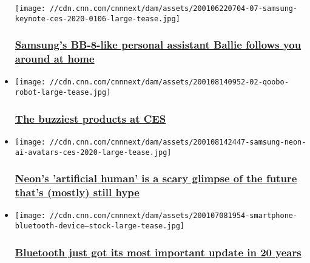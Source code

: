 \begin{itemize}
  \texttt{[image: //cdn.cnn.com/cnnnext/dam/assets/200106220704-07-samsung-keynote-ces-2020-0106-large-tease.jpg]}

  \hypertarget{samsungs-bb-8-like-personal-assistant-ballie-follows-you-around-at-home}{%
  \subsubsection{\texorpdfstring{\href{/2020/01/07/tech/samsung-ballie-ces-2020/index.html}{Samsung's
  BB-8-like personal assistant Ballie follows you around at
  home}}{Samsung's BB-8-like personal assistant Ballie follows you around at home}}\label{samsungs-bb-8-like-personal-assistant-ballie-follows-you-around-at-home}}
\item
  \href{/2020/01/08/tech/ces-2020-roundup/index.html}{}

  \texttt{[image: //cdn.cnn.com/cnnnext/dam/assets/200108140952-02-qoobo-robot-large-tease.jpg]}

  \hypertarget{the-buzziest-products-at-ces}{%
  \subsubsection{\texorpdfstring{\href{/2020/01/08/tech/ces-2020-roundup/index.html}{The
  buzziest products at
  CES}}{The buzziest products at CES}}\label{the-buzziest-products-at-ces}}
\item
  \href{/2020/01/10/tech/samsung-neon/index.html}{}

  \texttt{[image: //cdn.cnn.com/cnnnext/dam/assets/200108142447-samsung-neon-ai-avatars-ces-2020-large-tease.jpg]}

  \hypertarget{neons-artificial-human-is-a-scary-glimpse-of-the-future-thats-mostly-still-hype}{%
  \subsubsection{\texorpdfstring{\href{/2020/01/10/tech/samsung-neon/index.html}{Neon's
  'artificial human' is a scary glimpse of the future that's (mostly)
  still
  hype}}{Neon's 'artificial human' is a scary glimpse of the future that's (mostly) still hype}}\label{neons-artificial-human-is-a-scary-glimpse-of-the-future-thats-mostly-still-hype}}
\item
  \href{/2020/01/07/tech/bluetooth-le-update/index.html}{}

  \texttt{[image: //cdn.cnn.com/cnnnext/dam/assets/200107081954-smartphone-bluetooth-device---stock-large-tease.jpg]}

  \hypertarget{bluetooth-just-got-its-most-important-update-in-20-years}{%
  \subsubsection{\texorpdfstring{\href{/2020/01/07/tech/bluetooth-le-update/index.html}{Bluetooth
  just got its most important update in 20
  years}}{Bluetooth just got its most important update in 20 years}}\label{bluetooth-just-got-its-most-important-update-in-20-years}}
\end{itemize}

